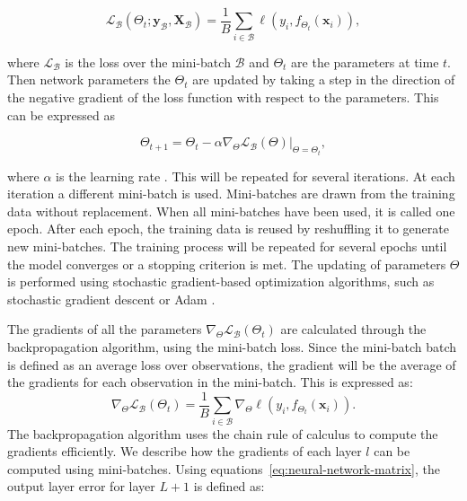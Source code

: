 \[
\mathcal{L}_\mathcal{B}(\Theta_t; \mathbf{y}_\mathcal{B}, \mathbf{X}_\mathcal{B}) = \frac{1}{B}\sum_{i \in \mathcal{B}} \ell(y_i, f_{\Theta_t}(\mathbf{x}_i)),
\]

where \(\mathcal{L}_\mathcal{B}\) is the loss over the mini-batch \(\mathcal{B}\) and \(\Theta_t\) are the parameters at time \(t\). Then network parameters the \(\Theta_t\) are updated by taking a step in the direction of the negative gradient of the loss function with respect to the parameters. This can be expressed as

\begin{equation}\label{eq:gradient-descent}
\Theta_{t+1} = \Theta_t - \alpha \nabla_\Theta \mathcal{L}_\mathcal{B}(\Theta)\bigg|_{\Theta = \Theta_t},
\end{equation}

where \(\alpha\) is the learning rate \parencite{smlbook, prince2023understanding}. This will be repeated for several iterations. At each iteration a different mini-batch is used. Mini-batches are drawn from the training data without replacement. When all mini-batches have been used, it is called one epoch. After each epoch, the training data is reused by reshuffling it to generate new mini-batches. The training process will be repeated for several epochs until the model converges or a stopping criterion is met. The updating of parameters \(\Theta\) is performed using stochastic gradient-based optimization algorithms, such as stochastic gradient descent or Adam \parencite{smlbook}.

The gradients of all the parameters \(\nabla_\Theta\mathcal{L}_\mathcal{B}(\Theta_t)\) are calculated through the backpropagation algorithm, using the mini-batch loss. Since the mini-batch batch is defined as an average loss over observations, the gradient will be the average of the gradients for each observation in the mini-batch. This is expressed as:
\[
\nabla_\Theta \mathcal{L}_\mathcal{B}(\Theta_t) = \frac{1}{B}\sum_{i \in \mathcal{B}} \nabla_\Theta \ell(y_i, f_{\Theta_t}(\mathbf{x}_i)).
\]
The backpropagation algorithm uses the chain rule of calculus to compute the gradients efficiently. We describe how the gradients of each layer \(l\) can be computed using mini-batches. Using equations~\ref{eq:neural-network-matrix}, the output layer error for layer \(L+1\) is defined as:

